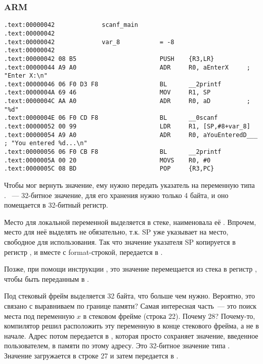 \subsubsection{ARM}

\myparagraph{\OptimizingKeilVI (\ThumbMode)}

\begin{lstlisting}
.text:00000042             scanf_main
.text:00000042
.text:00000042             var_8           = -8
.text:00000042
.text:00000042 08 B5                       PUSH    {R3,LR}
.text:00000044 A9 A0                       ADR     R0, aEnterX     ; "Enter X:\n"
.text:00000046 06 F0 D3 F8                 BL      __2printf
.text:0000004A 69 46                       MOV     R1, SP
.text:0000004C AA A0                       ADR     R0, aD          ; "%d"
.text:0000004E 06 F0 CD F8                 BL      __0scanf
.text:00000052 00 99                       LDR     R1, [SP,#8+var_8]
.text:00000054 A9 A0                       ADR     R0, aYouEnteredD___ ; "You entered %d...\n"
.text:00000056 06 F0 CB F8                 BL      __2printf
.text:0000005A 00 20                       MOVS    R0, #0
.text:0000005C 08 BD                       POP     {R3,PC}
\end{lstlisting}

\myindex{\CLanguageElements!\Pointers}
Чтобы \scanf мог вернуть значение, ему нужно передать указатель на переменную типа \Tint.
\Tint~--- 32-битное значение, для его хранения нужно только 4 байта, и оно помещается в 32-битный регистр.

Место для локальной переменной  выделяется в стеке, \IDA наименовала её . 
Впрочем, место для неё выделять не обязательно, т.к.  \ac{SP} уже указывает на место, 
свободное для использования.
Так что значение указателя \ac{SP} копируется в регистр , и вместе с format-строкой, 
передается в \scanf.

Позже, при помощи инструкции , это значение перемещается из стека в регистр , чтобы быть переданным в \printf.




Под стековый фрейм выделяется 32 байта, что больше чем нужно. Вероятно, это связано с выравниваем по границе памяти?
Самая интересная часть~--- это поиск места под переменную $x$ в стековом фрейме (строка 22).
Почему 28? Почему-то, компилятор решил расположить эту переменную в конце стекового фрейма, а не в начале.
Адрес потом передается в \scanf, которая просто сохраняет значение, введенное пользователем, в памяти по этому адресу.
Это 32-битное значение типа \Tint.
Значение загружается в строке 27 и затем передается в \printf.

